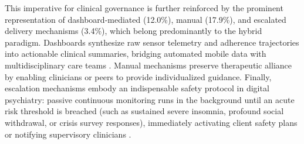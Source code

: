This imperative for clinical governance is further reinforced by the prominent representation of dashboard-mediated (12.0\%), manual (17.9\%), and escalated delivery mechanisms (3.4\%), which belong predominantly to the hybrid paradigm. Dashboards synthesize raw sensor telemetry and adherence trajectories into actionable clinical summaries, bridging automated mobile data with multidisciplinary care teams \cite{dowding2015dashboards, bosch2025integration}. Manual mechanisms preserve therapeutic alliance by enabling clinicians or peers to provide individualized guidance. Finally, escalation mechanisms embody an indispensable safety protocol in digital psychiatry: passive continuous monitoring runs in the background until an acute risk threshold is breached (such as sustained severe insomnia, profound social withdrawal, or crisis survey responses), immediately activating client safety plans or notifying supervisory clinicians \cite{martinezmartin2021ethical}.

